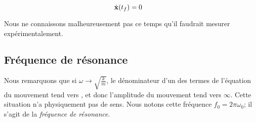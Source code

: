 $$\dot{\bf x}(t_f) = 0$$

Nous ne connaissons malheureusement pas ce temps qu'il faudrait mesurer expérimentalement.

\subsection{Fréquence de résonance}
Nous remarquons que si $\omega \rightarrow \sqrt{\frac{k}{m}}$, le dénominateur d'un des termes de l'équation du mouvement
tend vers , et donc l'amplitude du mouvement tend vers $\infty$. Cette situation n'a physiquement
pas de sens. Nous notons cette fréquence $f_0 =  2\pi\omega_0$; il s'agit de la \textit{fréquence de résonance}.


